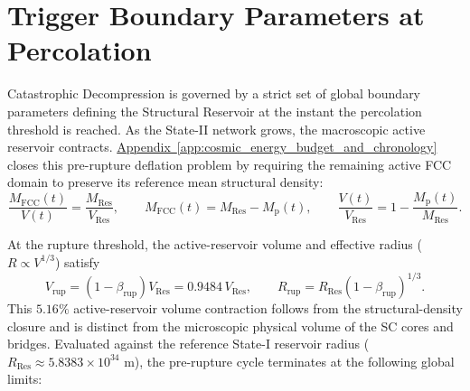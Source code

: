 \section{Trigger Boundary Parameters at Percolation}
\label{sec:trigger_boundary_parameters}

Catastrophic Decompression is governed by a strict set of global boundary parameters defining the Structural Reservoir at the instant the percolation threshold is reached. As the State-II network grows, the macroscopic active reservoir contracts. \hyperref[app:cosmic_energy_budget_and_chronology]{Appendix~\ref*{app:cosmic_energy_budget_and_chronology}} closes this pre-rupture deflation problem by requiring the remaining active FCC domain to preserve its reference mean structural density:
\begin{equation}
    \frac{M_{\mathrm{FCC}}(t)}{V(t)}
    =
    \frac{M_{\mathrm{Res}}}{V_{\mathrm{Res}}},
    \qquad
    M_{\mathrm{FCC}}(t)
    =
    M_{\mathrm{Res}}-M_{\mathrm{p}}(t),
    \qquad
    \frac{V(t)}{V_{\mathrm{Res}}}
    =
    1-\frac{M_{\mathrm{p}}(t)}{M_{\mathrm{Res}}}.
\end{equation}

At the rupture threshold, the active-reservoir volume and effective radius ($R \propto V^{1/3}$) satisfy
\begin{equation}
    V_{\mathrm{rup}}
    =
    (1-\beta_{\mathrm{rup}})V_{\mathrm{Res}}
    =
    0.9484\,V_{\mathrm{Res}},
    \qquad
    R_{\mathrm{rup}}
    =
    R_{\mathrm{Res}}(1-\beta_{\mathrm{rup}})^{1/3}.
\end{equation}
This $5.16\%$ active-reservoir volume contraction follows from the structural-density closure and is distinct from the microscopic physical volume of the SC cores and bridges. 
Evaluated against the reference State-I reservoir radius ($R_{\mathrm{Res}} \approx 5.8383 \times 10^{34}\text{ m}$), the pre-rupture cycle terminates at the following global limits:

